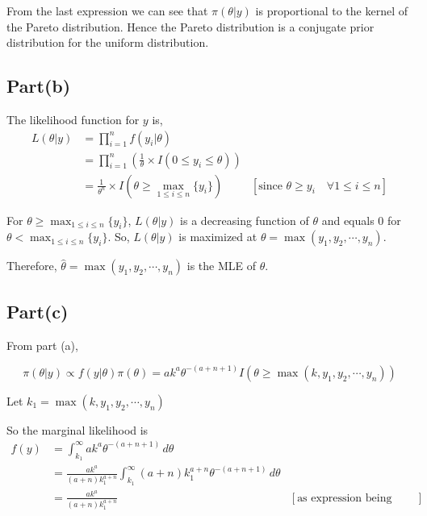 \documentclass[a4paper]{article}
\begin{document}
From the last expression we can see that \(\pi(\theta|y)\) is proportional to the kernel of the Pareto distribution. Hence the Pareto distribution is a conjugate prior distribution for the uniform distribution.

\subsection*{Part(b)}
The likelihood function for $y$ is,
\begin{align*}
    L(\theta|y) &= \prod_{i=1}^{n} f(y_i|\theta)\\
    &= \prod_{i=1}^{n} \left(\frac{1}{\theta} \times I(0 \leq y_i \leq \theta)\right)\\
    &= \frac{1}{\theta^n} \times I(\theta \geq \max_{1\leq i \leq n} \{y_i\}) & [\text{since \(\theta \geq y_i \quad \forall 1\leq i \leq n\)}]
\end{align*}

For \(\theta \geq \max_{1\leq i \leq n} \{y_i\}\), \(L(\theta|y)\) is a decreasing function of \(\theta\) and equals 0 for \(\theta < \max_{1\leq i \leq n} \{y_i\}\).
So, \(L(\theta|y)\) is maximized at \(\theta = \max (y_1, y_2, \cdots, y_n)\).
\vspace{0.25cm}

\noindent Therefore, \(\hat{\theta} =  \max (y_1, y_2, \cdots, y_n)\) is the MLE of \(\theta\).

\subsection*{Part(c)}

From part (a),

\[
\pi(\theta|y)  \propto f(y|\theta) \pi(\theta) =  a k^{a} \theta^{-(a+n+1)} I(\theta \geq \max(k,y_1,y_2,\cdots,y_n))
\]

Let \(k_1 = \max(k,y_1,y_2,\cdots,y_n)\)

\vspace{0.25cm}
So the marginal likelihood is 
\begin{align*}
    f(y) &= \int_{k_1}^{\infty} a k^{a} \theta^{-(a+n+1)} \,d\theta\\
        &= \frac{ak^{a}}{(a+n)k_1^{a+n}}\int_{k_1}^{\infty} (a+n) k_1^{a+n} \theta^{-(a+n+1)} \,d\theta\\
        &= \frac{ak^a}{(a+n)k_1^{a+n}} & \left[\text{as expression being integrated is pdf of Pareto distribution}\right]
\end{align*}
\end{document}
